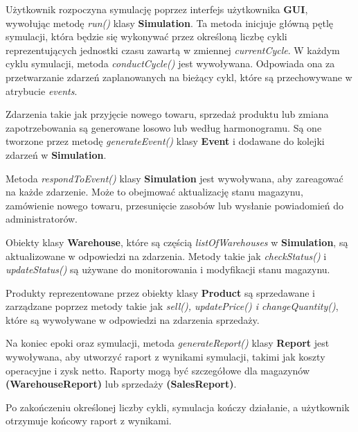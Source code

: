 \documentclass[11pt]{article}
\begin{document}
Użytkownik rozpoczyna symulację poprzez interfejs użytkownika \textbf{GUI}, wywołując metodę \textit{run()} klasy \textbf{Simulation}. Ta metoda inicjuje główną pętlę symulacji, która będzie się wykonywać przez określoną liczbę cykli reprezentujących jednostki czasu zawartą w zmiennej \textit{currentCycle}. W każdym cyklu symulacji, metoda \textit{conductCycle()} jest wywoływana. Odpowiada ona za przetwarzanie zdarzeń zaplanowanych na bieżący cykl, które są przechowywane w atrybucie \textit{events}. \par
Zdarzenia takie jak przyjęcie nowego towaru, sprzedaż produktu lub zmiana zapotrzebowania są generowane losowo lub według harmonogramu. Są one tworzone przez metodę \textit{generateEvent()} klasy \textbf{Event} i dodawane do kolejki zdarzeń w \textbf{Simulation}.\par
Metoda \textit{respondToEvent()} klasy \textbf{Simulation} jest wywoływana, aby zareagować na każde zdarzenie. Może to obejmować aktualizację stanu magazynu, zamówienie nowego towaru, przesunięcie zasobów lub wysłanie powiadomień do administratorów.\par
Obiekty klasy \textbf{Warehouse}, które są częścią \textit{listOfWarehouses} w \textbf{Simulation}, są aktualizowane w odpowiedzi na zdarzenia. Metody takie jak \textit{checkStatus()} i \textit{updateStatus()} są używane do monitorowania i modyfikacji stanu magazynu.\par
Produkty reprezentowane przez obiekty klasy \textbf{Product} są sprzedawane i zarządzane poprzez metody takie jak \textit{sell(), updatePrice() i changeQuantity()}, które są wywoływane w odpowiedzi na zdarzenia sprzedaży.\par
Na koniec epoki oraz symulacji, metoda \textit{generateReport()} klasy \textbf{Report} jest wywoływana, aby utworzyć raport z wynikami symulacji, takimi jak koszty operacyjne i zysk netto. Raporty mogą być szczegółowe dla magazynów \textbf{(WarehouseReport)} lub sprzedaży \textbf{(SalesReport)}.\par
Po zakończeniu określonej liczby cykli, symulacja kończy działanie, a użytkownik otrzymuje końcowy raport z wynikami.
\end{document}
